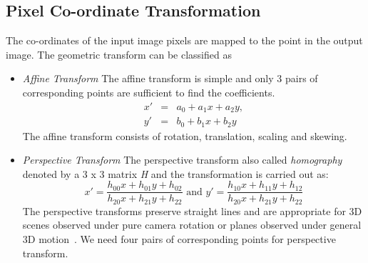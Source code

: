 \subsection*{Pixel Co-ordinate Transformation}
The co-ordinates of the input image pixels are mapped to the point in the output image. The geometric transform can be classified as
\begin{itemize}
	
	\item {\textit{Affine Transform}}
	The affine transform is simple and only 3 pairs of corresponding points are sufficient to find the coefficients.
	\begin{equation}
	\begin{array}{lcl}
		x' & = & a_0+a_1x+a_2y,\\
		y' & = & b_0+ b_1x+ b_2y
	\end{array}
	\label{eq:affine-trans}
	\end{equation}
	The affine transform consists of rotation, translation, scaling and skewing. 
	
	\item {\textit{Perspective Transform}}
	The perspective transform also called \emph{homography} denoted by a 3 x 3 matrix \textit{H} and the transformation is carried out as:
	\begin{equation}	
		x'  =  \frac{h_{00}x+h_{01}y+h_{02}}{h_{20}x+h_{21}y+h_{22}} \mbox{ and } 
		y'  =  \frac{h_{10}x+h_{11}y+h_{12}}{h_{20}x+h_{21}y+h_{22}}	
	\label{eq:perspective-transform}
	\end{equation}
	The perspective transforms preserve straight lines and are appropriate for 3D scenes observed under pure camera rotation or planes observed under general 3D motion~\cite{Szeliski:06}. We need four pairs of corresponding points for perspective transform.
	
	
\end{itemize}

